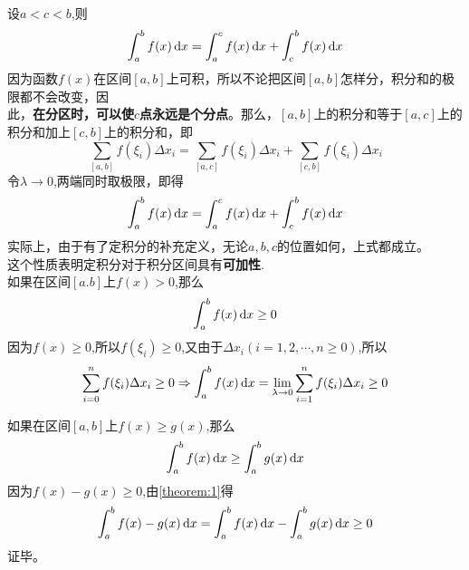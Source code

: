 \theorem[定上下限积分性质2]
设$a<c<b$,则
\begin{equation}
	\int_{a}^{b}f(x) \,{\rm{d}} x=\int_{a}^{c}f(x) \,{\rm{d}} x+\int_{c}^{b}f(x) \,{\rm{d}} x
\end{equation}
\proof 因为函数$f(x)$在区间$[a,b]$上可积，所以不论把区间$[a,b]$怎样分，积分和的极限都不会改变，因\vspace{-0.5em}\\ 此，\textbf{在分区时，可以使$c$点永远是个分点}。那么，$[a,b]$上的积分和等于$[a,c]$上的积分和加上$[c,b]$上的积分和，即
\begin{equation}
	\sum_{[a,b]}f(\xi_i)\Delta x_i=\sum_{[a,c]}f(\xi_i)\Delta x_i+\sum_{[c,b]}f(\xi_i)\Delta x_i
\end{equation}
令$\lambda\to0$,两端同时取极限，即得
\begin{equation}
	\int_{a}^{b}f(x) \,{\rm{d}} x=\int_{a}^{c}f(x) \,{\rm{d}} x+\int_{c}^{b}f(x) \,{\rm{d}} x
\end{equation}
\kg 实际上，由于有了定积分的补充定义，无论$a,b,c$的位置如何，上式都成立。\\
\kg 这个性质表明定积分对于积分区间具有\textbf{可加性}.\\

\theorem[定上下限积分性质3]
\label{theorem:1}
如果在区间$[a.b]$上$f(x)>0$,那么
\begin{equation}
	\int_{a}^{b}f(x) \,{\rm{d}} x\geq0
\end{equation}
\proof 因为$f(x)\geq 0$,所以$f(\xi_i)\geq0$,又由于$\Delta x_i(i=1,2,\cdots,n\geq0)$,所以\sj
\begin{equation}
	\sum_{i=0}^{n}f(\xi_i)\Delta x_i\geq0 \Rightarrow \int_{a}^{b}f(x) \,{\rm{d}} x=\lim\limits_{\lambda\to0}\sum_{i=1}^{n}f(\xi_i)\Delta x_i\geq 0
\end{equation}

\theorem[定上下限积分性质4]
\label{theorem:2}
如果在区间$[a,b]$上$f(x)\geq g(x)$,那么
\begin{equation}
	\int_{a}^{b}f(x) \,{\rm{d}} x\geq \int_{a}^{b}g(x) \,{\rm{d}} x
\end{equation}
\proof 因为$f(x)-g(x)\geq0$,由\ref{theorem:1}\hspace*{0.3em}得
\begin{equation}
	\int_{a}^{b}f(x)-g(x) \,{\rm{d}} x=\int_{a}^{b}f(x) \,{\rm{d}} x-\int_{a}^{b}g(x) \,
	{\rm{d}} x\geq0
\end{equation}
证毕。\\

